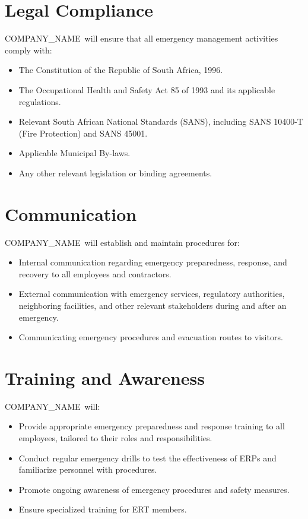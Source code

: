 \documentclass[11pt]{article}
\newcommand{\clientName}{{{COMPANY_NAME}}}
\begin{document}
\section{Legal Compliance}
\clientName\ will ensure that all emergency management activities comply with:
\begin{itemize}
    \item The Constitution of the Republic of South Africa, 1996.
    \item The Occupational Health and Safety Act 85 of 1993 and its applicable regulations.
    \item Relevant South African National Standards (SANS), including SANS 10400-T (Fire Protection) and SANS 45001.
    \item Applicable Municipal By-laws.
    \item Any other relevant legislation or binding agreements.
\end{itemize}

\section{Communication}
\clientName\ will establish and maintain procedures for:
\begin{itemize}
    \item Internal communication regarding emergency preparedness, response, and recovery to all employees and contractors.
    \item External communication with emergency services, regulatory authorities, neighboring facilities, and other relevant stakeholders during and after an emergency.
    \item Communicating emergency procedures and evacuation routes to visitors.
\end{itemize}

\section{Training and Awareness}
\clientName\ will:
\begin{itemize}
    \item Provide appropriate emergency preparedness and response training to all employees, tailored to their roles and responsibilities.
    \item Conduct regular emergency drills to test the effectiveness of ERPs and familiarize personnel with procedures.
    \item Promote ongoing awareness of emergency procedures and safety measures.
    \item Ensure specialized training for ERT members.
\end{itemize}
\end{document}
